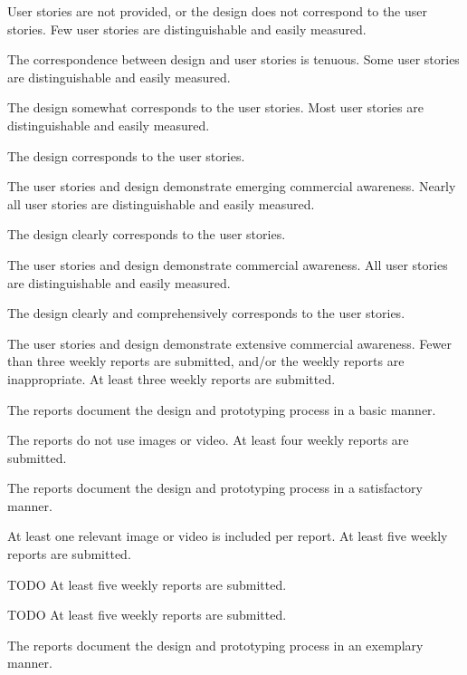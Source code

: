 \documentclass{../fal_assignment}
\begin{document}
\begin{markingrubric}
        \grade\fail User stories are not provided, or the design does not correspond to the user stories.
        \grade Few user stories are distinguishable and easily measured.
            \par The correspondence between design and user stories is tenuous.
        \grade Some user stories are distinguishable and easily measured.
            \par The design somewhat corresponds to the user stories.
        \grade Most user stories are distinguishable and easily measured.
            \par The design corresponds to the user stories.
            \par The user stories and design demonstrate emerging commercial awareness.
        \grade Nearly all user stories are distinguishable and easily measured.
            \par The design clearly corresponds to the user stories.
            \par The user stories and design demonstrate commercial awareness.
        \grade All user stories are distinguishable and easily measured.
            \par The design clearly and comprehensively corresponds to the user stories.
            \par The user stories and design demonstrate extensive commercial awareness.
        \grade\fail Fewer than three weekly reports are submitted,
            and/or the weekly reports are inappropriate.
        \grade At least three weekly reports are submitted.
            \par The reports document the design and prototyping process in a basic manner.
            \par The reports do not use images or video.
        \grade At least four weekly reports are submitted.
            \par The reports document the design and prototyping process in a satisfactory manner.
            \par At least one relevant image or video is included per report.
        \grade At least five weekly reports are submitted.
            \par TODO
        \grade At least five weekly reports are submitted.
            \par TODO
        \grade At least five weekly reports are submitted.
            \par The reports document the design and prototyping process in an exemplary manner.

\end{markingrubric}
\end{document}
